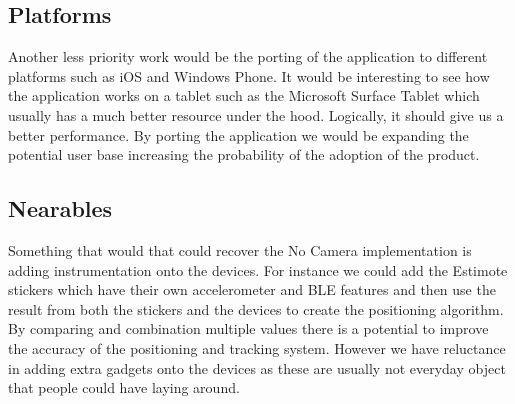 \subsection{Platforms}
Another less priority work would be the porting of the application to different platforms such as iOS and Windows Phone. It would be interesting to see how the application works on a tablet such as the Microsoft Surface Tablet which usually has a much better resource under the hood. Logically, it should give us a better performance. By porting the application we would be expanding the potential user base increasing the probability of the adoption of the product.

\subsection{Nearables}
Something that would that could recover the No Camera implementation is adding instrumentation onto the devices. For instance we could add the Estimote stickers which have their own accelerometer and BLE features and then use the result from both the stickers and the devices to create the positioning algorithm. By comparing and combination multiple values there is a potential to improve the accuracy of the positioning and tracking system. However we have reluctance in adding extra gadgets onto the devices as these are usually not everyday object that people could have laying around.